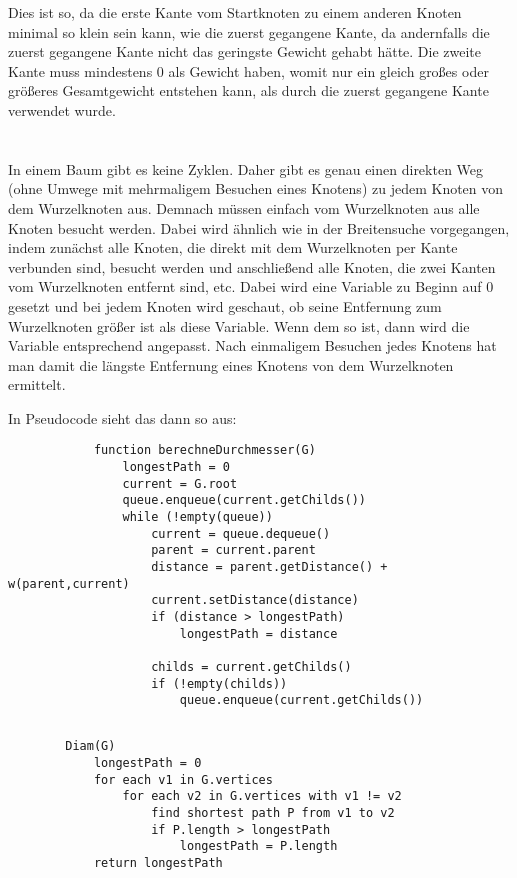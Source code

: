 \documentclass[10pt,a4paper,oneside,ngerman,numbers=noenddot]{scrartcl}
\begin{document}
	Dies ist so, da die erste Kante vom Startknoten zu einem anderen Knoten minimal so klein sein kann, wie die zuerst gegangene Kante, da andernfalls die zuerst gegangene Kante nicht das geringste Gewicht gehabt hätte. Die zweite Kante muss mindestens 0 als Gewicht haben, womit nur ein gleich großes oder größeres Gesamtgewicht entstehen kann, als durch die zuerst gegangene Kante verwendet wurde.
\section{} %
	\subsection{} %
		In einem Baum gibt es keine Zyklen. Daher gibt es genau einen direkten Weg (ohne Umwege mit mehrmaligem Besuchen eines Knotens) zu jedem Knoten von dem Wurzelknoten aus. Demnach müssen einfach vom Wurzelknoten aus alle Knoten besucht werden. Dabei wird ähnlich wie in der Breitensuche vorgegangen, indem zunächst alle Knoten, die direkt mit dem Wurzelknoten per Kante verbunden sind, besucht werden und anschließend alle Knoten, die zwei Kanten vom Wurzelknoten entfernt sind, etc. Dabei wird eine Variable zu Beginn auf 0 gesetzt und bei jedem Knoten wird geschaut, ob seine Entfernung zum Wurzelknoten größer ist als diese Variable. Wenn dem so ist, dann wird die Variable entsprechend angepasst. Nach einmaligem Besuchen jedes Knotens hat man damit die längste Entfernung eines Knotens von dem Wurzelknoten ermittelt.
		
		In Pseudocode sieht das dann so aus:
		
		\begin{verbatim}
		    function berechneDurchmesser(G)
		        longestPath = 0
		        current = G.root
		        queue.enqueue(current.getChilds())
		        while (!empty(queue))
		            current = queue.dequeue()
		   	        parent = current.parent
		   	        distance = parent.getDistance() + w(parent,current)
		   	        current.setDistance(distance)
		            if (distance > longestPath)
		                longestPath = distance
		            
		            childs = current.getChilds()
		            if (!empty(childs))
		                queue.enqueue(current.getChilds())
		\end{verbatim}
	\subsection{} %
		\begin{verbatim}		
		Diam(G)
		    longestPath = 0
		    for each v1 in G.vertices
		        for each v2 in G.vertices with v1 != v2
		            find shortest path P from v1 to v2
		            if P.length > longestPath
		                longestPath = P.length
		    return longestPath
    	\end{verbatim}
\end{document}
